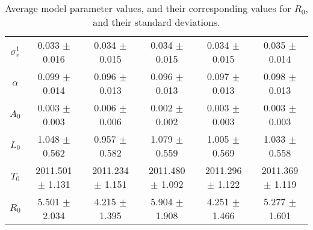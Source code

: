 \begin{sidewaystable}
\begin{tabular}{cccccc}
{\bf $\sigma^1_r$} & 0.033 $\pm$ 0.016 & 0.034 $\pm$ 0.015 & 0.034 $\pm$ 0.015 & 0.034 $\pm$ 0.015 & 0.035 $\pm$ 0.014 \\
{\bf $\alpha$} & 0.099 $\pm$ 0.014 & 0.096 $\pm$ 0.013 & 0.096 $\pm$ 0.013 & 0.097 $\pm$ 0.013 & 0.098 $\pm$ 0.013 \\
{\bf $A_0$} & 0.003 $\pm$ 0.003 & 0.006 $\pm$ 0.006 & 0.002 $\pm$ 0.002 & 0.003 $\pm$ 0.003 & 0.003 $\pm$ 0.003 \\
{\bf $L_0$} & 1.048 $\pm$ 0.562 & 0.957 $\pm$ 0.582 & 1.079 $\pm$ 0.559 & 1.005 $\pm$ 0.569 & 1.033 $\pm$ 0.558 \\
{\bf $T_0$} & 2011.501 $\pm$ 1.131 & 2011.234 $\pm$ 1.151 & 2011.480 $\pm$ 1.092 & 2011.296 $\pm$ 1.122 & 2011.369 $\pm$ 1.119 \\
{\bf $R_0$} & 5.501 $\pm$ 2.034& 4.215 $\pm$ 1.395& 5.904 $\pm$ 1.908& 4.251 $\pm$ 1.466& 5.277 $\pm$ 1.601\\
\hline\hline
\end{tabular}
\caption{Average model parameter values, and their corresponding values for $R_0$,  and their standard deviations.}
\label{Table:Parameter_Values}
\end{sidewaystable}
